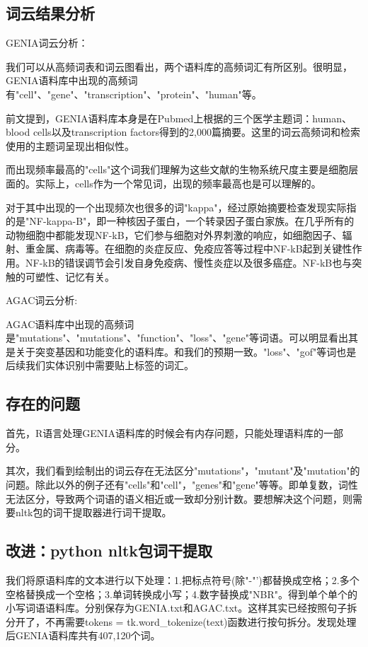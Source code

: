 \documentclass{article}
\begin{document}
\subsection{词云结果分析}
GENIA词云分析：\par
我们可以从高频词表和词云图看出，两个语料库的高频词汇有所区别。很明显，GENIA语料库中出现的高频词有"cell"、"gene"、"transcription"、"protein"、"human"等。\par
前文提到，GENIA语料库本身是在Pubmed上根据的三个医学主题词：human、blood cells以及transcription factors得到的2,000篇摘要。这里的词云高频词和检索使用的主题词呈现出相似性。\par
而出现频率最高的"cells"这个词我们理解为这些文献的生物系统尺度主要是细胞层面的。实际上，cells作为一个常见词，出现的频率最高也是可以理解的。\par
对于其中出现的一个出现频次也很多的词"kappa"，经过原始摘要检查发现实际指的是"NF-kappa-B"，即一种核因子蛋白，一个转录因子蛋白家族。在几乎所有的动物细胞中都能发现NF-kB，它们参与细胞对外界刺激的响应，如细胞因子、辐射、重金属、病毒等。在细胞的炎症反应、免疫应答等过程中NF-kB起到关键性作用。NF-kB的错误调节会引发自身免疫病、慢性炎症以及很多癌症。NF-kB也与突触的可塑性、记忆有关。\par
AGAC词云分析:\par
AGAC语料库中出现的高频词是"mutations"、"mutations"、"function"、"loss"、"gene"等词语。可以明显看出其是关于突变基因和功能变化的语料库。和我们的预期一致。"loss"、"gof"等词也是后续我们实体识别中需要贴上标签的词汇。
\subsection{存在的问题}
首先，R语言处理GENIA语料库的时候会有内存问题，只能处理语料库的一部分。\par
其次，我们看到绘制出的词云存在无法区分"mutations"，"mutant"及"mutation"的问题。除此以外的例子还有"cells"和"cell"，"genes"和"gene"等等。即单复数，词性无法区分，导致两个词语的语义相近或一致却分别计数。要想解决这个问题，则需要nltk包的词干提取器进行词干提取。
\subsection{改进：python nltk包词干提取}
我们将原语料库的文本进行以下处理：1.把标点符号(除"-"')都替换成空格；2.多个空格替换成一个空格；3.单词转换成小写；4.数字替换成"NBR"。得到单个单个的小写词语语料库。分别保存为GENIA.txt和AGAC.txt。这样其实已经按照句子拆分开了，不再需要tokens = tk.word\_tokenize(text)函数进行按句拆分。发现处理后GENIA语料库共有407,120个词。
\end{document}
